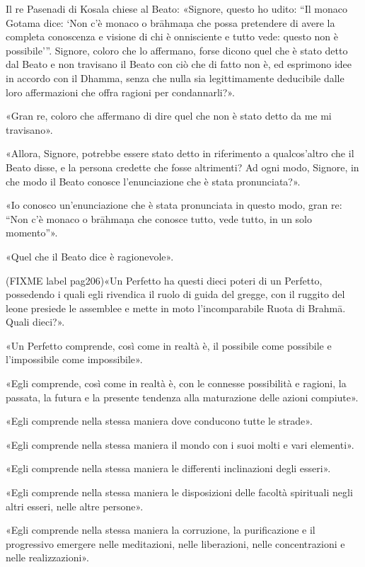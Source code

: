 

Il re Pasenadi di Kosala chiese al Beato: «Signore, questo ho udito: “Il
monaco Gotama dice: ‘Non c’è monaco o brāhmaṇa che possa pretendere di
avere la completa conoscenza e visione di chi è onnisciente e tutto vede:
questo non è possibile’”. Signore, coloro che lo affermano, forse dicono
quel che è stato detto dal Beato e non travisano il Beato con ciò che di
fatto non è, ed esprimono idee in accordo con il Dhamma, senza che nulla
sia legittimamente deducibile dalle loro affermazioni che offra ragioni
per condannarli?».


«Gran re, coloro che affermano di dire quel che non è stato detto da me
mi travisano».


«Allora, Signore, potrebbe essere stato detto in riferimento a
qualcos’altro che il Beato disse, e la persona credette che fosse
altrimenti? Ad ogni modo, Signore, in che modo il Beato conosce
l’enunciazione che è stata pronunciata?».


«Io conosco un’enunciazione che è stata pronunciata in questo modo, gran
re: “Non c’è monaco o brāhmaṇa che conosce tutto, vede tutto, in un solo
momento”».


«Quel che il Beato dice è ragionevole».




(FIXME label pag206)«Un Perfetto ha questi dieci poteri di un Perfetto, possedendo i quali
egli rivendica il ruolo di guida del gregge, con il ruggito del leone
presiede le assemblee e mette in moto l’incomparabile Ruota di Brahmā.
Quali dieci?».


«Un Perfetto comprende, così come in realtà è, il possibile come
possibile e l’impossibile come impossibile».


«Egli comprende, così come in realtà è, con le connesse possibilità e
ragioni, la passata, la futura e la presente tendenza alla maturazione
delle azioni compiute».


«Egli comprende nella stessa maniera dove conducono tutte le strade».


«Egli comprende nella stessa maniera il mondo con i suoi molti e vari
elementi».


«Egli comprende nella stessa maniera le differenti inclinazioni degli
esseri».


«Egli comprende nella stessa maniera le disposizioni delle facoltà
spirituali negli altri esseri, nelle altre persone».


«Egli comprende nella stessa maniera la corruzione, la purificazione e
il progressivo emergere nelle meditazioni, nelle liberazioni, nelle
concentrazioni e nelle realizzazioni».


